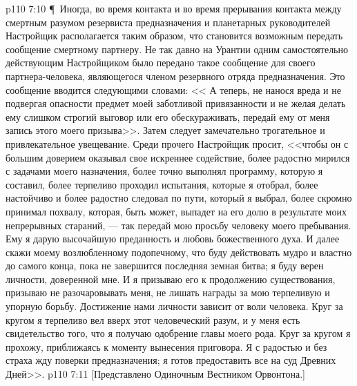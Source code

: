 \vs p110 7:10 \P\ Иногда, во время контакта и во время прерывания контакта между смертным разумом резервиста предназначения и планетарных руководителей Настройщик располагается таким образом, что становится возможным передать сообщение смертному партнеру. Не так давно на Урантии одним самостоятельно действующим Настройщиком было передано такое сообщение для своего партнера\hyp{}человека, являющегося членом резервного отряда предназначения. Это сообщение вводится следующими словами: << А теперь, не нанося вреда и не подвергая опасности предмет моей заботливой привязанности и не желая делать ему слишком строгий выговор или его обескураживать, передай ему от меня запись этого моего призыва>>. Затем следует замечательно трогательное и привлекательное увещевание. Среди прочего Настройщик просит, <<чтобы он с большим доверием оказывал свое искреннее содействие, более радостно мирился с задачами моего назначения, более точно выполнял программу, которую я составил, более терпеливо проходил испытания, которые я отобрал, более настойчиво и более радостно следовал по пути, который я выбрал, более скромно принимал похвалу, которая, быть может, выпадет на его долю в результате моих непрерывных стараний, --- так передай мою просьбу человеку моего пребывания. Ему я дарую высочайшую преданность и любовь божественного духа. И далее скажи моему возлюбленному подопечному, что буду действовать мудро и властно до самого конца, пока не завершится последняя земная битва; я буду верен личности, доверенной мне. И я призываю его к продолжению существования, призываю не разочаровывать меня, не лишать награды за мою терпеливую и упорную борьбу. Достижение нами личности зависит от воли человека. Круг за кругом я терпеливо вел вверх этот человеческий разум, и у меня есть свидетельство того, что я получаю одобрение главы моего рода. Круг за кругом я прохожу, приближаясь к моменту вынесения приговора. Я с радостью и без страха жду поверки предназначения; я готов предоставить все на суд Древних Дней>>.
\vs p110 7:11 [Представлено Одиночным Вестником Орвонтона.]
